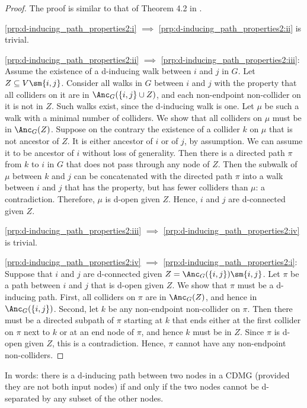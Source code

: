\begin{proof}
  The proof is similar to that of Theorem 4.2 in \cite{RichardsonSpirtes02}.

  \ref{prp:d-inducing_path_properties2:i} $\implies$ \ref{prp:d-inducing_path_properties2:ii} is trivial.

  \ref{prp:d-inducing_path_properties2:ii} $\implies$ \ref{prp:d-inducing_path_properties2:iii}: Assume the existence of a d-inducing walk between $i$ and $j$ in $G$. 
  Let $Z \subseteq V \sm\{i,j\}$. 
  Consider all walks in $G$ between $i$ and $j$ with the property that all colliders on it are in $\Anc_{G}({\{i,j\} \cup Z)}$, and each non-endpoint non-collider on it is not in $Z$.
  Such walks exist, since the d-inducing walk is one. 
  Let $\mu$ be such a walk with a minimal number of colliders.
  We show that all colliders on $\mu$ must be in $\Anc_{G}(Z)$. 
  Suppose on the contrary the existence of a collider $k$ on $\mu$ that is not ancestor of $Z$.
  It is either ancestor of $i$ or of $j$, by assumption.
  We can assume it to be ancestor of $i$ without loss of generality.
  Then there is a directed path $\pi$ from $k$ to $i$ in $G$ that does not pass through any node of $Z$.
  Then the subwalk of $\mu$ between $k$ and $j$ can be concatenated with the directed path $\pi$
  into a walk between $i$ and $j$ that has the property, but has fewer colliders than $\mu$: a contradiction. 
  Therefore, $\mu$ is d-open given $Z$.
  Hence, $i$ and $j$ are d-connected given $Z$.

  \ref{prp:d-inducing_path_properties2:iii} $\implies$ \ref{prp:d-inducing_path_properties2:iv} is trivial.

  \ref{prp:d-inducing_path_properties2:iv} $\implies$ \ref{prp:d-inducing_path_properties2:i}:
  Suppose that %
  $i$ and $j$ are d-connected given $Z = \Anc_{G}(\{i,j\}) \sm \{i,j\}$. 
  Let $\pi$ be a path between $i$ and $j$ that is d-open given $Z$. %
  We show that $\pi$ must be a d-inducing path. 
  First, all colliders on $\pi$ are in $\Anc_G(Z)$, and hence in $\Anc_{G}(\{i,j\})$.
  Second, let $k$ be any non-endpoint non-collider on $\pi$.
  Then there must be a directed subpath of $\pi$ starting at $k$ that ends either at the first collider on $\pi$ next to $k$ or at an end node of $\pi$, and hence $k$ must be in $Z$. 
  Since $\pi$ is d-open given $Z$, this is a contradiction.
  Hence, $\pi$ cannot have any non-endpoint non-colliders.
\end{proof}
In words: there is a d-inducing path between two nodes in a CDMG (provided they are not both input nodes) if and only if the two nodes cannot be d-separated by any subset of the other nodes.

